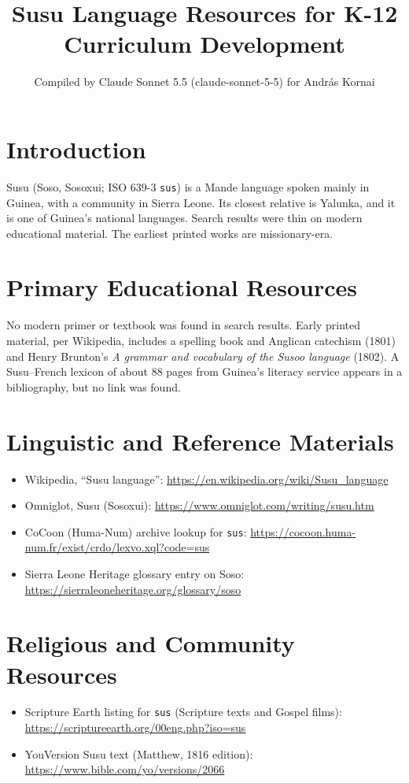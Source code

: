 \documentclass[12pt]{article}
\title{Susu Language Resources for K-12 Curriculum Development}
\author{Compiled by Claude Sonnet 5.5 (claude-sonnet-5-5) for Andr\'as Kornai}
\date{}
\begin{document}
\maketitle

\section{Introduction}
Susu (Soso, Sosoxui; ISO 639-3 \texttt{sus}) is a Mande language spoken mainly in Guinea, with a community in Sierra Leone. Its closest relative is Yalunka, and it is one of Guinea's national languages. Search results were thin on modern educational material. The earliest printed works are missionary-era.

\section{Primary Educational Resources}
No modern primer or textbook was found in search results. Early printed material, per Wikipedia, includes a spelling book and Anglican catechism (1801) and Henry Brunton's \emph{A grammar and vocabulary of the Susoo language} (1802). A Susu--French lexicon of about 88 pages from Guinea's literacy service appears in a bibliography, but no link was found.

\section{Linguistic and Reference Materials}
\begin{itemize}
\item Wikipedia, ``Susu language'': \url{https://en.wikipedia.org/wiki/Susu_language}
\item Omniglot, Susu (Sosoxui): \url{https://www.omniglot.com/writing/susu.htm}
\item CoCoon (Huma-Num) archive lookup for \texttt{sus}: \url{https://cocoon.huma-num.fr/exist/crdo/lexvo.xql?code=sus}
\item Sierra Leone Heritage glossary entry on Soso: \url{https://sierraleoneheritage.org/glossary/soso}
\end{itemize}

\section{Religious and Community Resources}
\begin{itemize}
\item Scripture Earth listing for \texttt{sus} (Scripture texts and Gospel films): \url{https://scriptureearth.org/00eng.php?iso=sus}
\item YouVersion Susu text (Matthew, 1816 edition): \url{https://www.bible.com/yo/versions/2066}
\end{itemize}
\end{document}
